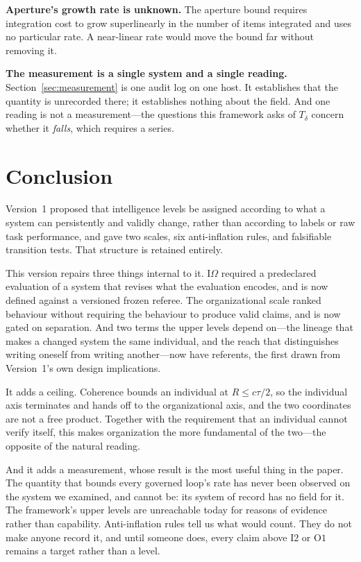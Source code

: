 \documentclass[11pt]{article}
\newcommand{\Ilev}[1]{\ensuremath{\mathrm{I}#1}}
\newcommand{\Olev}[1]{\ensuremath{\mathrm{O}#1}}
\newcommand{\IOm}{\ensuremath{\mathrm{I}\Omega}}
\newcommand{\Td}{\ensuremath{T_\delta}}
\begin{document}
\textbf{Aperture's growth rate is unknown.} The aperture bound requires integration cost to grow superlinearly in the number of items integrated and uses no particular rate. A near-linear rate would move the bound far without removing it.

\textbf{The measurement is a single system and a single reading.} Section~\ref{sec:measurement} is one audit log on one host. It establishes that the quantity is unrecorded there; it establishes nothing about the field. And one reading is not a measurement---the questions this framework asks of \Td{} concern whether it \emph{falls}, which requires a series.

\section{Conclusion}

Version~1 proposed that intelligence levels be assigned according to what a system can persistently and validly change, rather than according to labels or raw task performance, and gave two scales, six anti-inflation rules, and falsifiable transition tests. That structure is retained entirely.

This version repairs three things internal to it. \IOm{} required a predeclared evaluation of a system that revises what the evaluation encodes, and is now defined against a versioned frozen referee. The organizational scale ranked behaviour without requiring the behaviour to produce valid claims, and is now gated on separation. And two terms the upper levels depend on---the lineage that makes a changed system the same individual, and the reach that distinguishes writing oneself from writing another---now have referents, the first drawn from Version~1's own design implications.

It adds a ceiling. Coherence bounds an individual at $R \le c\tau/2$, so the individual axis terminates and hands off to the organizational axis, and the two coordinates are not a free product. Together with the requirement that an individual cannot verify itself, this makes organization the more fundamental of the two---the opposite of the natural reading.

And it adds a measurement, whose result is the most useful thing in the paper. The quantity that bounds every governed loop's rate has never been observed on the system we examined, and cannot be: its system of record has no field for it. The framework's upper levels are unreachable today for reasons of evidence rather than capability. Anti-inflation rules tell us what would count. They do not make anyone record it, and until someone does, every claim above \Ilev{2} or \Olev{1} remains a target rather than a level.



\end{document}
